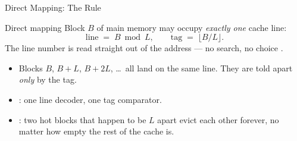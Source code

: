 \documentclass[aspectratio=169]{beamer}
\begin{document}
\begin{frame}{Direct Mapping: The Rule}
  \begin{block}{Direct mapping}
    Block $B$ of main memory may occupy \emph{exactly one} cache line:
    \[
      \text{line} \;=\; B \bmod L ,
      \qquad
      \text{tag} \;=\; \lfloor B / L \rfloor .
    \]
    The line number is read straight out of the address --- no search, no
    choice \cite[Fig.~5.7, PDF p.~190]{Stallings2015_computer_organization}.
  \end{block}
  \begin{itemize}
    \item Blocks $B$, $B+L$, $B+2L$, \dots\ all land on the same line. They are
      told apart \emph{only} by the tag.
    \item {}: one line decoder, one tag
      comparator.
    \item {}: two hot blocks that happen to be $L$ apart evict
      each other forever, no matter how empty the rest of the cache is.
  \end{itemize}
\end{frame}
\end{document}
